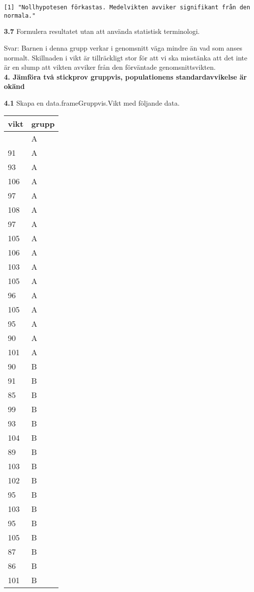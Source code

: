 \documentclass[
  letterpaper,
  DIV=11,
  numbers=noendperiod]{scrartcl}
\begin{document}
\begin{verbatim}
[1] "Nollhypotesen förkastas. Medelvikten avviker signifikant från den normala."
\end{verbatim}

\textbf{3.7} Formulera resultatet utan att använda statistisk
terminologi.

\hfill\break
Svar: Barnen i denna grupp verkar i genomsnitt väga mindre än vad som
anses normalt. Skillnaden i vikt är tillräckligt stor för att vi ska
misstänka att det inte är en slump att vikten avviker från den
förväntade genomsnittsvikten.\\

\textbf{4. Jämföra två stickprov gruppvis, populationens
standardavvikelse är okänd}

\textbf{4.1} Skapa en data.frameGruppvis.Vikt med följande data.

\begin{longtable}[]{@{}ll@{}}
\toprule\noalign{}
vikt & grupp \\
\midrule\noalign{}
\endhead
\bottomrule\noalign{}
\endlastfoot
90 & A \\
91 & A \\
93 & A \\
106 & A \\
97 & A \\
108 & A \\
97 & A \\
105 & A \\
106 & A \\
103 & A \\
105 & A \\
96 & A \\
105 & A \\
95 & A \\
90 & A \\
101 & A \\
90 & B \\
91 & B \\
85 & B \\
99 & B \\
93 & B \\
104 & B \\
89 & B \\
103 & B \\
102 & B \\
95 & B \\
103 & B \\
95 & B \\
105 & B \\
87 & B \\
86 & B \\
101 & B \\
\end{longtable}
\end{document}
